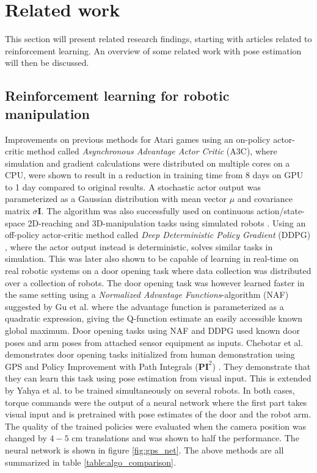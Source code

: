 \chapter{Related work}

This section will present related research findings, starting with articles
related to reinforcement learning. An overview of some related work with pose
estimation will then be discussed.

\section{Reinforcement learning for robotic manipulation}

Improvements on previous methods for Atari games using an on-policy
actor-critic method called \textit{Asynchronous Advantage Actor Critic} (A3C),
where simulation and gradient calculations were distributed on multiple cores
on a CPU, were shown to result in a reduction in training time from 8 days on
GPU to 1 day compared to original results. A stochastic actor output was
parameterized as a Gaussian distribution with mean vector $\mu$ and covariance
matrix $\sigma\mathbf{I}$. The algorithm was also successfully used on
continuous action/state-space 2D-reaching and 3D-manipulation tasks using
simulated robots \cite{mnih2016asynchronous}. Using an off-policy actor-critic
method called \textit{Deep Deterministic Policy Gradient} (DDPG)
\cite{lillicrap2015continuous}, where the actor output instead is
deterministic, solves similar tasks in simulation. This was later also shown to
be capable of learning in real-time on real robotic systems on a door opening
task \cite{gu2016deep} where data collection was distributed over a collection
of robots. The door opening task was however learned faster in the same setting
using a \textit{Normalized Advantage Functions}-algorithm (NAF) suggested by Gu
et al. \cite{gu2016continuous} where the advantage function is parameterized as
a quadratic expression, giving the Q-function estimate an easily accessible
known global maximum. Door opening tasks using NAF and DDPG used known door
poses and arm poses from attached sensor equipment as inputs.  Chebotar et al.
\cite{chebotar2016path} demonstrates door opening tasks initialized from human
demonstration using GPS and Policy Improvement with Path Integrals
($\mathbf{PI}^2$) \cite{theodorou2010generalized}. They demonstrate that they
can learn this task using pose estimation from visual input. This is extended
by Yahya et al.  \cite{yahya2016collective} to be trained simultaneously on
several robots. In both cases, torque commands were the output of a neural
network where the first part takes visual input and is pretrained with pose
estimates of the door and the robot arm. The quality of the trained policies
were evaluated when the camera position was changed by $4-5$ cm translations
and was shown to half the performance. The neural network is shown in figure
\ref{fig:gps_net}. The above methods are all summarized in table
\ref{table:algo_comparison}.

